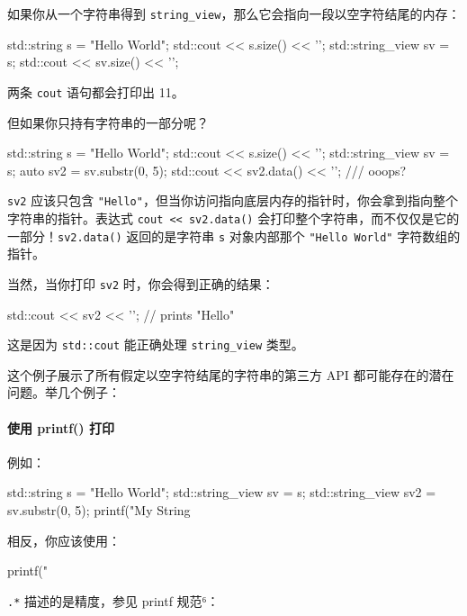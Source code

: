 如果你从一个字符串得到 \texttt{string\_view}，那么它会指向一段以空字符结尾的内存：

\begin{codebox}[cpp]
std::string s = "Hello World";
std::cout << s.size() << '\n';
std::string_view sv = s;
std::cout << sv.size() << '\n';
\end{codebox}

两条 \texttt{cout} 语句都会打印出 11。

但如果你只持有字符串的一部分呢？

\begin{codebox}[cpp]
std::string s = "Hello World";
std::cout << s.size() << '\n';
std::string_view sv = s;
auto sv2 = sv.substr(0, 5);
std::cout << sv2.data() << '\n'; /// ooops?
\end{codebox}

\texttt{sv2} 应该只包含 \texttt{"Hello"}，但当你访问指向底层内存的指针时，你会拿到指向整个字符串的指针。表达式 \texttt{cout << sv2.data()} 会打印整个字符串，而不仅仅是它的一部分！\texttt{sv2.data()} 返回的是字符串 \texttt{s} 对象内部那个 \texttt{"Hello World"} 字符数组的指针。

当然，当你打印 \texttt{sv2} 时，你会得到正确的结果：

\begin{codebox}[cpp]
std::cout << sv2 << '\n';
// prints "Hello"
\end{codebox}

这是因为 \texttt{std::cout} 能正确处理 \texttt{string\_view} 类型。

这个例子展示了所有假定以空字符结尾的字符串的第三方 API 都可能存在的潜在问题。举几个例子：

\paragraph{使用 printf() 打印}

例如：

\begin{codebox}[cpp]
std::string s = "Hello World";
std::string_view sv = s;
std::string_view sv2 = sv.substr(0, 5);
printf("My String %
\end{codebox}

相反，你应该使用：

\begin{codebox}[cpp]
printf("%
\end{codebox}

\texttt{.*} 描述的是精度，参见 printf 规范⁶：

